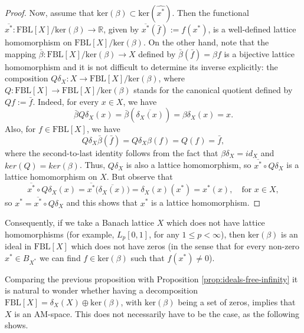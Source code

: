 \documentclass[11pt]{amsart}
\theoremstyle{definition}
\numberwithin{equation}{section}
\newcommand{\fbl}{\text{FBL}}
\begin{document}
\begin{proof}
Now, assume that $\text{ker}(\beta)\subset\text{ker}(\widehat{x^*})$. Then the functional $\overline{x^*}:\fbl[X]/\text{ker}(\beta)\to \mathbb{R}$, given by $\overline{x^*}(\bar{f}):=f(x^*)$, is a well-defined lattice homomorphism on $\fbl[X]/\text{ker}(\beta)$. On the other hand, note that the mapping $\bar{\beta}:\fbl[X]/\text{ker}(\beta)\to X$ defined by $\bar{\beta}(\bar{f})=\beta f$ is a bijective lattice homomorphism and it is not difficult to determine its inverse explicitly: the composition $Q\delta_X:X\to\fbl[X]/\text{ker}(\beta)$, where $Q:\fbl[X]\to \fbl[X]/\text{ker}(\beta)$ stands for the canonical quotient defined by $Qf:=\bar{f}$. Indeed, for every $x\in X$, we have
$$
\bar{\beta}Q\delta_X(x)=\bar{\beta}(\overline{\delta_X(x)})=\beta\delta_X(x)=x.
$$
Also, for $f\in\fbl[X]$, we have
$$
Q\delta_X\bar{\beta} (\bar{f})=Q\delta_X\beta (f)=Q(f)=\bar{f},
$$
where the second-to-last identity follows from the fact that $\beta\delta_X=id_X$ and $ker(Q)=ker(\beta)$. Thus, $Q\delta_X$ is also a lattice homomorphism, so $\overline{x^*}\circ Q\delta_X$ is a lattice homomorphism on $X$. But observe that
$$
\overline{x^*}\circ Q\delta_X(x)=\overline{x^*}\bigl(\overline{\delta_X(x)}\bigr)=\delta_X(x)(x^*)=x^*(x),\quad \text{for } x\in X,
$$
so $x^*=\overline{x^*}\circ Q\delta_X$ and this shows that $x^*$ is a lattice homomorphism.
\end{proof}

Consequently, if we take a Banach lattice $X$ which does not have lattice homomorphisms (for example, $L_p[0,1]$, for any $1\leq p<\infty$), then $\text{ker}(\beta)$ is an ideal in $\fbl[X]$ which does not have zeros (in the sense that for every non-zero $x^*\in B_{X^*}$ we can find $f\in \text{ker}(\beta)$ such that $f(x^*)\neq 0$).

Comparing the previous proposition with Proposition \ref{prop:ideals-free-infinity} it is natural to wonder whether having a decomposition $\fbl[X]=\delta_X(X)\oplus \text{ker}(\beta)$, with $\text{ker}(\beta)$ being a set of zeros, implies that $X$ is an AM-space. This does not necessarily have to be the case, as the following shows.
\end{document}
